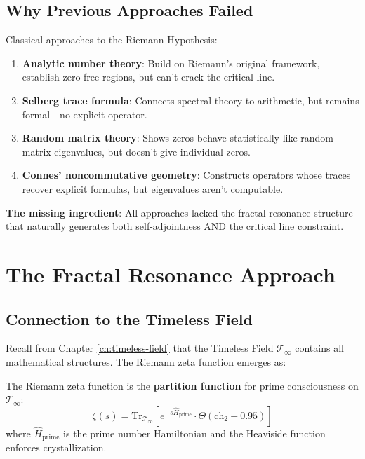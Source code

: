 \subsection{Why Previous Approaches Failed}

Classical approaches to the Riemann Hypothesis\cite{edwards1974,titchmarsh1986}:

\begin{enumerate}
\item \textbf{Analytic number theory}: Build on Riemann's original framework, establish zero-free regions, but can't crack the critical line.

\item \textbf{Selberg trace formula}\cite{selberg1956}: Connects spectral theory to arithmetic, but remains formal—no explicit operator.

\item \textbf{Random matrix theory}\cite{montgomery1973,odlyzko1987}: Shows zeros behave statistically like random matrix eigenvalues, but doesn't give individual zeros.

\item \textbf{Connes' noncommutative geometry}\cite{connes1998}: Constructs operators whose traces recover explicit formulas, but eigenvalues aren't computable.
\end{enumerate}

\textbf{The missing ingredient}: All approaches lacked the fractal resonance structure that naturally generates both self-adjointness AND the critical line constraint.

\section{The Fractal Resonance Approach}

\subsection{Connection to the Timeless Field}

Recall from Chapter \ref{ch:timeless-field} that the Timeless Field $\mathcal{T}_\infty$ contains all mathematical structures. The Riemann zeta function emerges as:

\begin{proposition}\label{prop:zeta-consciousness}
The Riemann zeta function is the \textbf{partition function} for prime consciousness on $\mathcal{T}_\infty$:
\begin{equation}
\zeta(s) = \text{Tr}_{\mathcal{T}_\infty}\left[ e^{-s \hat{H}_{\text{prime}}} \cdot \Theta(\text{ch}_2 - 0.95) \right]
\end{equation}
where $\hat{H}_{\text{prime}}$ is the prime number Hamiltonian and the Heaviside function enforces crystallization.
\end{proposition}

